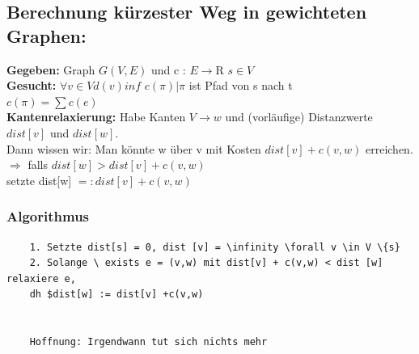 \documentclass{article}
\begin{document}
\subsection{Berechnung kürzester Weg in gewichteten Graphen: }
\textbf{Gegeben: } Graph $G(V,E)$ und c : $E \rightarrow $R$ $ $ s \in V$ \\
\textbf{Gesucht: } $\forall v \in V  d(v) inf$ { $c( \pi) | \pi$ ist Pfad von s nach t } \\
$ c(\pi) = \sum c(e) $ \\
\newline
\textbf{Kantenrelaxierung: } Habe Kanten $V \rightarrow w$ und (vorläufige) Distanzwerte $dist[v]$ und $dist [w]$. \\
Dann wissen wir: Man könnte w über v mit Kosten $dist[v] + c(v,w) $ erreichen.
$\Rightarrow$ falls $dist[w] > dist [v] + c(v,w)$ \\
setzte dist[w] $=: dist[v] + c(v,w)$ \\
\newline
\subsubsection{Algorithmus}
\begin{verbatim}
    1. Setzte dist[s] = 0, dist [v] = \infinity \forall v \in V \{s} 
    2. Solange \ exists e = (v,w) mit dist[v] + c(v,w) < dist [w]  relaxiere e,
    dh $dist[w] := dist[v] +c(v,w) 

    
    Hoffnung: Irgendwann tut sich nichts mehr
\end{verbatim}
\end{document}
